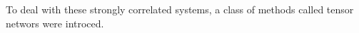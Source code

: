 
To deal with these strongly correlated systems, a class of methods called tensor networs were introced.


